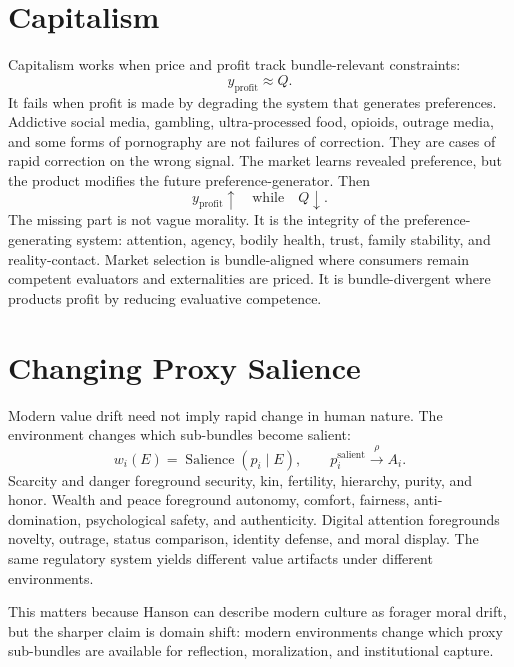 \documentclass[10pt,twocolumn]{article}
\begin{document}
\section{Capitalism}
Capitalism works when price and profit track bundle-relevant constraints:
\begin{equation}
y_{\mathrm{profit}} \approx Q.
\end{equation}
It fails when profit is made by degrading the system that generates preferences. 
Addictive social media, gambling, ultra-processed food, opioids, outrage media, and some forms of pornography are not failures of correction. They are cases of rapid correction on the wrong signal. The market learns revealed preference, but the product modifies the future preference-generator. 
Then
\begin{equation}
y_{\mathrm{profit}} \uparrow \quad \text{while} \quad Q \downarrow.
\end{equation}
The missing part is not vague morality. It is the integrity of the preference-generating system: attention, agency, bodily health, trust, family stability, and reality-contact. Market selection is bundle-aligned where consumers remain competent evaluators and externalities are priced. It is bundle-divergent where products profit by reducing evaluative competence.

\section{Changing Proxy Salience}
Modern value drift need not imply rapid change in human nature. The environment changes which sub-bundles become salient:
\begin{equation}
w_i(E)=\operatorname{Salience}(p_i\mid E), \qquad p_i^{\mathrm{salient}} \xrightarrow{\rho} A_i.
\end{equation}
Scarcity and danger foreground security, kin, fertility, hierarchy, purity, and honor. 
Wealth and peace foreground autonomy, comfort, fairness, anti-domination, psychological safety, and authenticity. 
Digital attention foregrounds novelty, outrage, status comparison, identity defense, and moral display. 
The same regulatory system yields different value artifacts under different environments.

This matters because Hanson can describe modern culture as forager moral drift, but the sharper claim is domain shift: modern environments change which proxy sub-bundles are available for reflection, moralization, and institutional capture.
\end{document}
